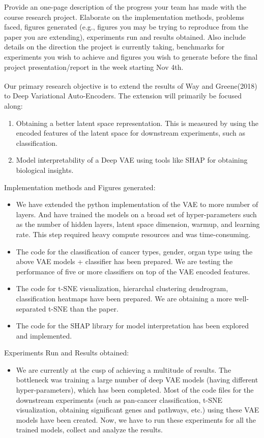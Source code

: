 \documentclass[solution,addpoints,12pt]{exam}
\begin{document}
\begin{questions}
\question[8] Provide an one-page description of the progress your team has made with the course research project. Elaborate on the implementation methods, problems faced, figures generated (e.g., figures you may be trying to reproduce from the paper you are extending), experiments run and results obtained. Also include details on the direction the project is currently taking, benchmarks for experiments you wish to achieve and figures you wish to generate before the final project presentation/report in the week starting Nov 4th.
\begin{solution}
Our primary research objective is to extend the results of Way and Greene(2018)\textsuperscript{\cite{2}} to Deep Variational Auto-Encoders.
The extension will primarily be focused along:
\begin{enumerate}[topsep=0pt]
\itemsep0em 
\item Obtaining a better latent space representation. This is measured by using the encoded features of the latent space for downstream experiments, such as classification.
\item Model interpretability of a Deep VAE using tools like SHAP for obtaining biological insights.
\end{enumerate}
Implementation methods and Figures generated:
\begin{itemize}[topsep=0pt]
\itemsep0em 
\item We have extended the python implementation of the VAE to more number of layers. And have trained the models on a broad set of hyper-parameters such as the number of hidden layers, latent space dimension, warmup, and learning rate. This step required heavy compute resources and was time-consuming.
\item The code for the classification of cancer types, gender, organ type using the above VAE models + classifier has been prepared. We are testing the performance of five or more classifiers on top of the VAE encoded features.
\item The code for t-SNE visualization, hierarchal clustering dendrogram, classification heatmaps have been prepared. We are obtaining a more well-separated t-SNE than the paper.
\item The code for the SHAP library for model interpretation has been explored and implemented.
\end{itemize}
Experiments Run and Results obtained: 
\begin{itemize}[topsep=0pt]
\item We are currently at the cusp of achieving a multitude of results. The bottleneck was training a large number of deep VAE models (having different hyper-parameters), which has been completed. Most of the code files for the downstream experiments (such as pan-cancer classification, t-SNE visualization, obtaining significant genes and pathways, etc.) using these VAE models have been created. Now, we have to run these experiments for all the trained models, collect and analyze the results.

\end{itemize}
\end{solution}
\end{questions}
\end{document}
